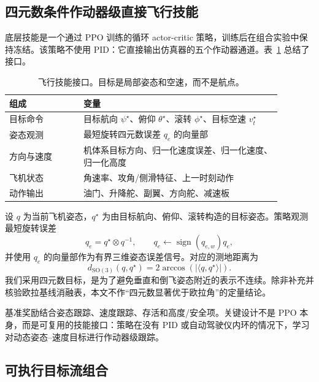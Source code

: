 \documentclass{article}
\newcommand{\vt}{v_t}
\begin{document}
\subsection{四元数条件作动器级直接飞行技能}

底层技能是一个通过 PPO 训练的循环 actor-critic 策略，训练后在组合实验中保持冻结。该策略不使用 PID：它直接输出仿真器的五个作动器通道。表~\ref{tab:policy-interface-cn} 总结了接口。

\begin{table}[t]
  \caption{飞行技能接口。目标是局部姿态和空速，而不是航点。}
  \label{tab:policy-interface-cn}
  \centering
  \begin{tabular}{p{0.24\linewidth}p{0.64\linewidth}}
    \toprule
    \textbf{组成} & \textbf{变量} \\
    \midrule
    目标命令 & 目标航向 $\psi^\star$、俯仰 $\theta^\star$、滚转 $\phi^\star$、目标空速 $\vt^\star$ \\
    姿态观测 & 最短旋转四元数误差 $q_e$ 的向量部 \\
    方向与速度 & 机体系目标方向、归一化速度误差、归一化速度、归一化高度 \\
    飞机状态 & 角速率、攻角/侧滑特征、上一时刻动作 \\
    动作输出 & 油门、升降舵、副翼、方向舵、减速板 \\
    \bottomrule
  \end{tabular}
\end{table}

设 $q$ 为当前飞机姿态，$q^\star$ 为由目标航向、俯仰、滚转构造的目标姿态。策略观测最短旋转误差
\begin{equation}
  q_e = q^\star \otimes q^{-1}, \qquad q_e \leftarrow \operatorname{sign}(q_{e,w})q_e ,
  \label{eq:quat-error-cn}
\end{equation}
并使用 $q_e$ 的向量部作为有界三维姿态误差信号。对应的测地距离为
\begin{equation}
  d_{\mathrm{SO(3)}}(q,q^\star) = 2\arccos\left(|\langle q,q^\star\rangle|\right).
\end{equation}
我们采用四元数目标，是为了避免垂直和倒飞姿态附近的表示不连续。除非补充并核验欧拉基线消融表，本文不作“四元数显著优于欧拉角”的定量结论。

基准奖励结合姿态跟踪、速度跟踪、存活和高度/安全项。关键设计不是 PPO 本身，而是可复用的技能接口：策略在没有 PID 或自动驾驶仪内环的情况下，学习对动态姿态--速度目标进行作动器级跟踪。

\subsection{可执行目标流组合}
\end{document}
